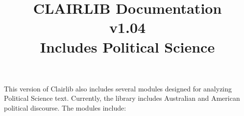 

\title{\Huge CLAIRLIB Documentation\\ v1.04\\ Includes Political Science}









This version of Clairlib also includes several modules designed for analyzing Political Science text.  Currently, the library includes Australian and American political discourse.  The modules include:








